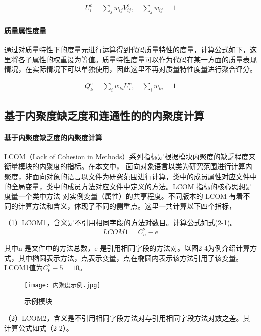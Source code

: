 \begin{align}
U_i^c = \sum_j w_{ij} V_{ij}^c, \quad \sum_j w_{ij} = 1
\end{align}

\paragraph{质量属性度量} 通过对质量特性下的度量元进行运算得到代码质量特性的度量，计算公式如下，这里将各子属性的权重设为等值。质量特性度量可以作为代码在某一方面的质量表现情况，在实际情况下可以单独使用，因此这里不再对质量特性度量进行聚合评分。

\begin{align}
Q_k^c = \sum_i w_{ki} U_{i}^c, \quad \sum_i w_{ki} = 1
\end{align}

\subsection{基于内聚度缺乏度和连通性的的内聚度计算}

\paragraph{基于内聚度缺乏度的内聚度计算} LCOM（Lack of Cohesion in Methods）系列指标是根据模块内聚度的缺乏程度来衡量模块的内聚度的指标。在本文中，
面向对象语言以类为研究范围进行计算内聚度，非面向对象的语言以文件为研究范围进行计算，类中的成员属性对应文件中的全局变量，类中的成员方法对应文件中定义的方法。LCOM 指标的核心思想是度量一个类中方法
对实例变量（属性）的共享程度。不同版本的 LCOM 有着不同的计算方法和含义，体现了不同的侧重点。这里一共计算以下四个指标，

（1）LCOM1，含义是不引用相同字段的方法对数目\cite{1994Ametr}。计算公式如式(2-1)。
\begin{equation}
LCOM1 = C_{n}^{2}-e
\end{equation}

其中n 是文件中的方法总数，e 是引用相同字段的方法对。以图2-4为例介绍计算方式，其中椭圆表示方法，点表示变量，点在椭圆内表示该方法引用了该变量。LCOM1值为\(C_{6}^{2} - 5 = 10\)。

\begin{figure}[h]
\centering
\texttt{[image: 内聚度示例.jpg]}
\caption{示例模块}
\end{figure}
    

（2）LCOM2，含义是不引用相同字段方法对与引用相同字段方法对数之差\cite{1996Coupling}。其计算公式如式（2-2）。

